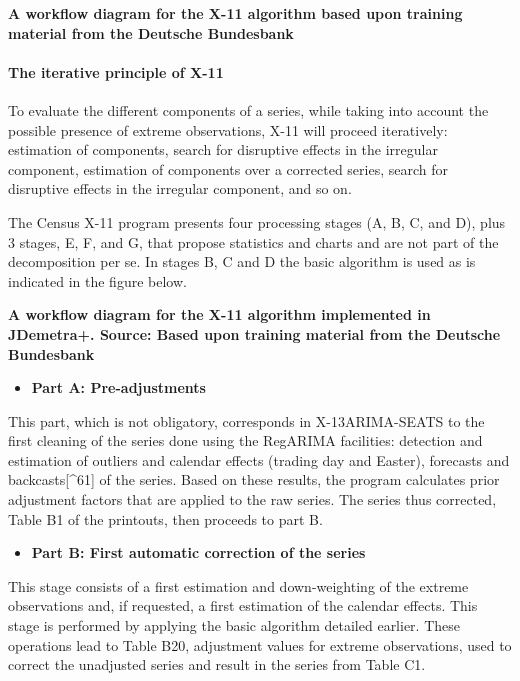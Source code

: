 \documentclass[
]{book}
\providecommand{\tightlist}{%
  \setlength{\itemsep}{0pt}\setlength{\parskip}{0pt}}
\begin{document}
\textbf{A workflow diagram for the X-11 algorithm based upon training material from the Deutsche Bundesbank}

\hypertarget{the-iterative-principle-of-x-11}{%
\paragraph{\texorpdfstring{\textbf{The iterative principle of X-11}}{The iterative principle of X-11}}\label{the-iterative-principle-of-x-11}}

To evaluate the different components of a series, while taking into
account the possible presence of extreme observations, X-11 will proceed
iteratively: estimation of components, search for disruptive effects in
the irregular component, estimation of components over a corrected
series, search for disruptive effects in the irregular component, and so
on.

The Census X-11 program presents four processing stages (A, B, C, and
D), plus 3 stages, E, F, and G, that propose statistics and charts and
are not part of the decomposition per se. In stages B, C and D the basic
algorithm is used as is indicated in the figure below.

\textbf{A workflow diagram for the X-11 algorithm implemented in
JDemetra+. Source: Based upon training material from the Deutsche
Bundesbank}

\begin{itemize}
\tightlist
\item
  \textbf{Part A: Pre-adjustments}
\end{itemize}

This part, which is not obligatory, corresponds in X-13ARIMA-SEATS to
the first cleaning of the series done using the RegARIMA facilities:
detection and estimation of outliers and calendar effects (trading day
and Easter), forecasts and backcasts{[}\^{}61{]} of the series. Based on these
results, the program calculates prior adjustment factors that are
applied to the raw series. The series thus corrected, Table B1 of the
printouts, then proceeds to part B.

\begin{itemize}
\tightlist
\item
  \textbf{Part B: First automatic correction of the series}
\end{itemize}

This stage consists of a first estimation and down-weighting of the
extreme observations and, if requested, a first estimation of the
calendar effects. This stage is performed by applying the basic
algorithm detailed earlier. These operations lead to Table B20,
adjustment values for extreme observations, used to correct the
unadjusted series and result in the series from Table C1.
\end{document}
